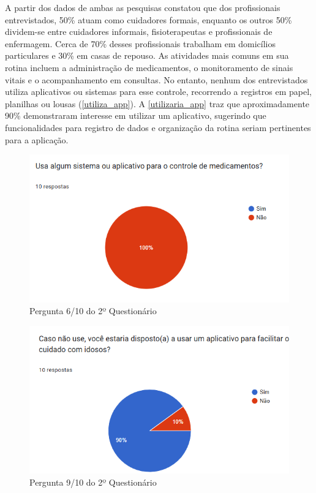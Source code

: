 \documentclass[
	article,			%
	12pt,				%
	oneside,			%
	a4paper,			%
    BIBLATEX,           %
	english,			%
	brazil,				%
	sumario=tradicional
	]{abntex2}
\begin{document}
A partir dos dados de ambas as pesquisas constatou que dos profissionais entrevistados, 50\% atuam como cuidadores formais, enquanto os outros 50\% dividem-se entre cuidadores informais, fisioterapeutas e profissionais de enfermagem. Cerca de 70\% desses profissionais trabalham em domicílios particulares e 30\% em casas de repouso. As atividades mais comuns em sua rotina incluem a administração de medicamentos, o monitoramento de sinais vitais e o acompanhamento em consultas. No entanto, nenhum dos entrevistados utiliza aplicativos ou sistemas para esse controle, recorrendo a registros em papel, planilhas ou lousas (\autoref{utiliza_app}). A \autoref{utilizaria_app} traz que aproximadamente 90\% demonstraram interesse em utilizar um aplicativo, sugerindo que funcionalidades para registro de dados e organização da rotina seriam pertinentes para a aplicação.

\begin{figure}[!htbp]
    \centering
    \includegraphics[width=0.75\linewidth]{Figuras/utiliza-app.png}
    \caption{Pergunta 6/10 do 2º Questionário}
    \label{utiliza_app}
\end{figure}

\begin{figure}[!htbp]
    \centering
    \includegraphics[width=0.75\linewidth]{Figuras/utilizaria-app.png}
    \caption{Pergunta 9/10 do 2º Questionário}
    \label{utilizaria_app}
\end{figure}
\end{document}
